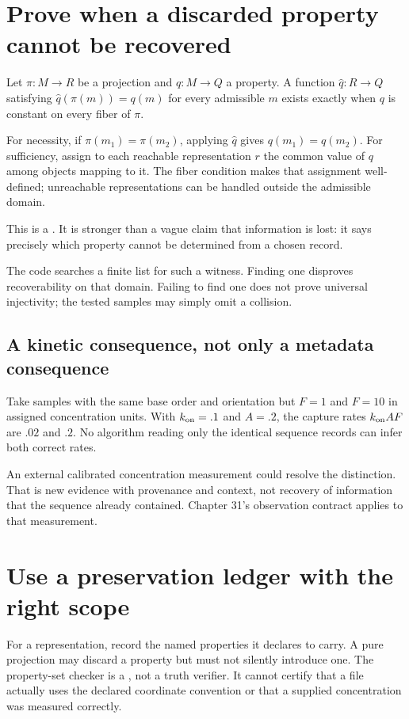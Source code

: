 \section{Prove when a discarded property cannot be recovered}
Let $\pi:M\to R$ be a projection and $q:M\to Q$ a property. A function
$\widehat q:R\to Q$ satisfying $\widehat q(\pi(m))=q(m)$ for every admissible
$m$ exists exactly when $q$ is constant on every fiber of $\pi$.

For necessity, if $\pi(m_1)=\pi(m_2)$, applying $\widehat q$ gives
$q(m_1)=q(m_2)$. For sufficiency, assign to each reachable representation
$r$ the common value of $q$ among objects mapping to it. The fiber condition
makes that assignment well-defined; unreachable representations can be handled
outside the admissible domain.

This is a . It is stronger than a vague
claim that information is lost: it says precisely which property cannot be
determined from a chosen record.

The code searches a finite list for such a witness. Finding one disproves
recoverability on that domain. Failing to find one does not prove universal
injectivity; the tested samples may simply omit a collision.

\subsection{A kinetic consequence, not only a metadata consequence}
Take samples with the same base order and orientation but $F=1$ and $F=10$
in assigned concentration units. With $k_{\rm on}=.1$ and $A=.2$, the capture
rates $k_{\rm on}AF$ are $.02$ and $.2$. No algorithm reading only the identical
sequence records can infer both correct rates.

An external calibrated concentration measurement could resolve the distinction.
That is new evidence with provenance and context, not recovery of information
that the sequence already contained. Chapter 31's observation contract applies
to that measurement.

\section{Use a preservation ledger with the right scope}
For a representation, record the named properties it declares to carry.
A pure projection may discard a property but must not silently introduce one.
The property-set checker is a , not a truth verifier.
It cannot certify that a file actually uses the declared coordinate convention
or that a supplied concentration was measured correctly.

